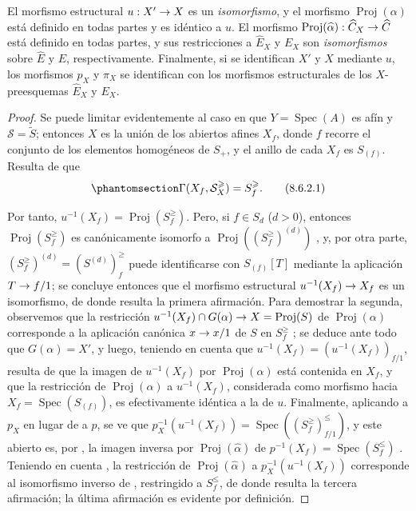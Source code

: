 \documentclass[oneside,10pt]{amsart}
\makeatletter
\renewcommand{\leq}{\leqslant}
\renewcommand{\geq}{\geqslant}
\newcommand{\ega@arrow}[2]{\mathchoice{#1}{#2}{#2}{#2}}
\renewcommand{\to}{\ega@arrow{\longrightarrow}{\rightarrow}}
\let\EGAOriginalLabel\label
\renewcommand{\label}[1]{\phantomsection\EGAOriginalLabel{#1}}
\makeatother
\begin{document}
\begin{proposition}[8.6.2]
\label{II.8.6.2-fr}
El morfismo estructural $u:X'\to X$ es un \emph{isomorfismo}, y el morfismo $\operatorname{Proj}(\alpha)$ está definido en todas partes y es idéntico a $u$.
El morfismo $\operatorname{Proj}(\widehat{\alpha}):\widehat{C}_X\to\widehat{C}$ está definido en todas partes, y sus restricciones a $\widehat{E}_X$ y $E_X$ son \emph{isomorfismos} sobre $\widehat{E}$ y $E$, respectivamente.
Finalmente, si se identifican $X'$ y $X$ mediante $u$, los morfismos $p_X$ y $\pi_X$ se identifican con los morfismos estructurales de los $X$-preesquemas $\widehat{E}_X$ y $E_X$.
\end{proposition}

\begin{proof}
Se puede limitar evidentemente al caso en que $Y=\operatorname{Spec}(A)$ es afín y $\mathcal{S}=\widetilde{S}$;
entonces $X$ es la unión de los abiertos afines $X_f$, donde $f$ recorre el conjunto de los elementos homogéneos de $S_+$, y el anillo de cada $X_f$ es $S_{(f)}$.
Resulta de  que
\begin{equation}
\label{II.8.6.2.1-fr}
  \Gamma(X_f,\mathcal{S}_X^{\geq})=S_f^{\geq}.
\tag{8.6.2.1}
\end{equation}

Por tanto, $u^{-1}(X_f)=\operatorname{Proj}(S_f^{\geq})$.
Pero, si $f\in S_d$ ($d>0$), entonces $\operatorname{Proj}(S_f^{\geq})$ es canónicamente isomorfo a $\operatorname{Proj}((S_f^{\geq})^{(d)})$ , y, por otra parte, $(S_f^{\geq})^{(d)}=(S^{(d)})_f^{\geq}$ puede identificarse con $S_{(f)}[T]$  mediante la aplicación $T\to f/1$;
se concluye entonces  que el morfismo estructural $u^{-1}(X_f)\to X_f$ es un isomorfismo, de donde resulta la primera afirmación.
Para demostrar la segunda, observemos que la restricción $u^{-1}(X_f)\cap G(\alpha)\to X=\operatorname{Proj}(S)$ de $\operatorname{Proj}(\alpha)$ corresponde a la aplicación canónica $x\to x/1$ de $S$ en $S_f^{\geq}$ ;
se deduce ante todo que $G(\alpha)=X'$, y luego, teniendo en cuenta que $u^{-1}(X_f)=(u^{-1}(X_f))_{f/1}$, resulta de  que la imagen de $u^{-1}(X_f)$ por $\operatorname{Proj}(\alpha)$ está contenida en $X_f$, y que la restricción de $\operatorname{Proj}(\alpha)$ a $u^{-1}(X_f)$, considerada como morfismo hacia $X_f=\operatorname{Spec}(S_{(f)})$, es efectivamente idéntica a la de $u$.
Finalmente, aplicando  a $p_X$ en lugar de a $p$, se ve que $p_X^{-1}(u^{-1}(X_f))=
\operatorname{Spec}((S_f^{\geq})_{f/1}^{\leq})$, y este abierto es, por , la imagen inversa por $\operatorname{Proj}(\widehat{\alpha})$ de $p^{-1}(X_f)=\operatorname{Spec}(S_f^{\leq})$ .
Teniendo en cuenta , la restricción de $\operatorname{Proj}(\widehat{\alpha})$ a $p_X^{-1}(u^{-1}(X_f))$ corresponde al isomorfismo inverso de , restringido a $S_f^{\leq}$, de donde resulta la tercera afirmación;
la última afirmación es evidente por definición.


\end{proof}
\end{document}
